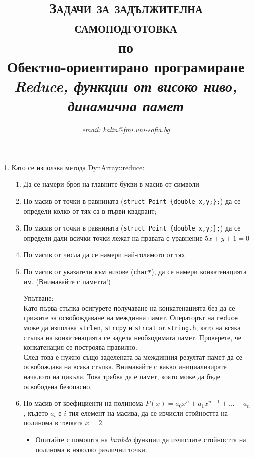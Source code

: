 \documentclass[12pt,a4paper]{article}
\author{\textit{email: kalin@fmi.uni-sofia.bg}}
\title{\textsc{Задачи за задължителна самоподготовка} \\
по \\
Обектно-ориентирано програмиране\\
\textit{Reduce, функции от високо ниво, динамична памет}}
\begin{document}
\maketitle


\begin{enumerate}

	\item Като се използва метода DynArray::reduce:

		\begin{enumerate}
			\item Да се намери броя на главните букви в масив от символи
			\item По масив от точки в равнината (\texttt{struct Point \{double x,y;\};}) да се определи колко от тях са в първи квадрант;
			\item По масив от точки в равнината (\texttt{struct Point \{double x,y;\};}) да се определи дали всички точки лежат на правата с уравнение $5x + y + 1 = 0$
			\item По масив от числа да се намери най-голямото от тях
			\item По масив от указатели към низове (\texttt{char*}), да се намери конкатенацията им. (Внимавайте с паметта!)
			\begin{mdframed}[hidealllines=true,backgroundcolor=gray!20]
			Упътване:\\

			Като първа стъпка осигурете получаване на конкатенацията без да се грижите за освобождаване на междинна памет. Операторът на \texttt{reduce} може да използва \texttt{strlen}, \texttt{strcpy} и \texttt{strcat} от \texttt{string.h}, като на всяка стъпка на конкатенацията се заделя необходимата памет. Проверете, че конкатенация се построява правилно.\\

			След това е нужно също заделената за междинния резултат памет да се освобождава на всяка стъпка. Внимавайте с какво инициализирате началото на цикъла. Това трябва да е памет, която може да бъде освободена безопасно.
			\end{mdframed}
			\item По масив от коефициенти на полинома $P(x)=a_0x^n + a_1x^{n-1} + ...+ a_n$, където $a_i$ е $i$-тия елемент на масива, да се изчисли стойността на полинома в точката $x=2$.
			\begin{itemize}
				\item Опитайте с помощта на \textit{lambda} функции да изчислите стойността на полинома в няколко различни точки.
			\end{itemize}


\end{enumerate}
\end{enumerate}
\end{document}
